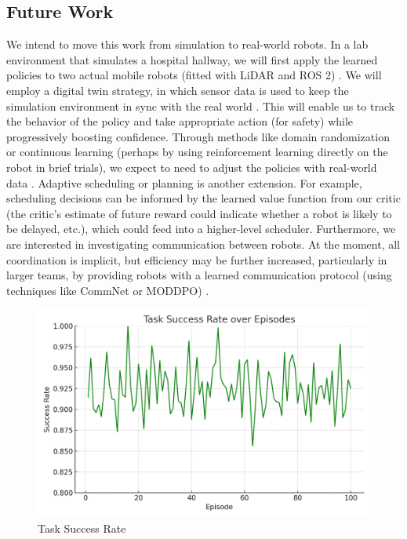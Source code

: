\documentclass[conference]{IEEEtran}
\begin{document}
\subsection{Future Work}
We intend to move this work from simulation to real-world robots. In a lab environment that simulates a hospital hallway, we will first apply the learned policies to two actual mobile robots (fitted with LiDAR and ROS 2) \citep{ztouni2021}. We will employ a digital twin strategy, in which sensor data is used to keep the simulation environment in sync with the real world \citep{yoo2023, yoo2023a}. This will enable us to track the behavior of the policy and take appropriate action (for safety) while progressively boosting confidence. Through methods like domain randomization or continuous learning (perhaps by using reinforcement learning directly on the robot in brief trials), we expect to need to adjust the policies with real-world data \citep{yang2022}. Adaptive scheduling or planning is another extension. For example, scheduling decisions can be informed by the learned value function from our critic (the critic’s estimate of future reward could indicate whether a robot is likely to be delayed, etc.), which could feed into a higher-level scheduler. Furthermore, we are interested in investigating communication between robots. At the moment, all coordination is implicit, but efficiency may be further increased, particularly in larger teams, by providing robots with a learned communication protocol (using techniques like CommNet or MODDPO) \citep{ivanovic2019, yang2022}.
\begin{figure}
    \centering
    \includegraphics[width=0.75\linewidth]{success_rate.png}
    \caption{Task Success Rate}
    \label{fig:placeholder}
\end{figure}
\end{document}

